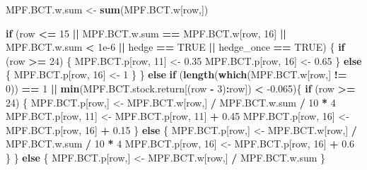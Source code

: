 \documentclass[
]{article}
\newenvironment{Shaded}{\begin{snugshade}}{\end{snugshade}}
\newcommand{\ControlFlowTok}[1]{\textcolor[rgb]{0.13,0.29,0.53}{\textbf{#1}}}
\newcommand{\DecValTok}[1]{\textcolor[rgb]{0.00,0.00,0.81}{#1}}
\newcommand{\FloatTok}[1]{\textcolor[rgb]{0.00,0.00,0.81}{#1}}
\newcommand{\KeywordTok}[1]{\textcolor[rgb]{0.13,0.29,0.53}{\textbf{#1}}}
\newcommand{\NormalTok}[1]{#1}
\newcommand{\OperatorTok}[1]{\textcolor[rgb]{0.81,0.36,0.00}{\textbf{#1}}}
\newcommand{\OtherTok}[1]{\textcolor[rgb]{0.56,0.35,0.01}{#1}}
\newcommand{\StringTok}[1]{\textcolor[rgb]{0.31,0.60,0.02}{#1}}
\begin{document}
\begin{Shaded}
\begin{Highlighting}[]
  
  
\NormalTok{  MPF.BCT.w.sum <-}\StringTok{ }\KeywordTok{sum}\NormalTok{(MPF.BCT.w[row,])}
  
  
  \ControlFlowTok{if}\NormalTok{ (row }\OperatorTok{<=}\StringTok{ }\DecValTok{15} \OperatorTok{||}\StringTok{ }\NormalTok{MPF.BCT.w.sum }\OperatorTok{==}\StringTok{ }\NormalTok{MPF.BCT.w[row, }\DecValTok{16}\NormalTok{] }\OperatorTok{||}
\StringTok{      }\NormalTok{MPF.BCT.w.sum }\OperatorTok{<}\StringTok{ }\FloatTok{1e-6} \OperatorTok{||}\StringTok{ }\NormalTok{hedge }\OperatorTok{==}\StringTok{ }\OtherTok{TRUE} \OperatorTok{||}\StringTok{ }\NormalTok{hedge_once }\OperatorTok{==}\StringTok{ }\OtherTok{TRUE}\NormalTok{) \{}
    \ControlFlowTok{if}\NormalTok{ (row }\OperatorTok{>=}\StringTok{ }\DecValTok{24}\NormalTok{) \{}
\NormalTok{      MPF.BCT.p[row, }\DecValTok{11}\NormalTok{] <-}\StringTok{ }\FloatTok{0.35}
\NormalTok{      MPF.BCT.p[row, }\DecValTok{16}\NormalTok{] <-}\StringTok{ }\FloatTok{0.65}
\NormalTok{    \} }\ControlFlowTok{else}\NormalTok{ \{}
\NormalTok{      MPF.BCT.p[row, }\DecValTok{16}\NormalTok{] <-}\StringTok{ }\DecValTok{1}
\NormalTok{    \}}
\NormalTok{  \} }\ControlFlowTok{else} \ControlFlowTok{if}\NormalTok{ (}\KeywordTok{length}\NormalTok{(}\KeywordTok{which}\NormalTok{(MPF.BCT.w[row,] }\OperatorTok{!=}\StringTok{ }\DecValTok{0}\NormalTok{)) }\OperatorTok{==}\StringTok{ }\DecValTok{1} \OperatorTok{||}
\StringTok{             }\KeywordTok{min}\NormalTok{(MPF.BCT.stock.return[(row }\OperatorTok{-}\StringTok{ }\DecValTok{3}\NormalTok{)}\OperatorTok{:}\NormalTok{row]) }\OperatorTok{<}\StringTok{ }\FloatTok{-0.065}\NormalTok{)\{}
    \ControlFlowTok{if}\NormalTok{ (row }\OperatorTok{>=}\StringTok{ }\DecValTok{24}\NormalTok{) \{}
\NormalTok{      MPF.BCT.p[row,] <-}\StringTok{ }\NormalTok{MPF.BCT.w[row,] }\OperatorTok{/}\StringTok{ }\NormalTok{MPF.BCT.w.sum }\OperatorTok{/}\StringTok{ }\DecValTok{10} \OperatorTok{*}\StringTok{ }\DecValTok{4}
\NormalTok{      MPF.BCT.p[row, }\DecValTok{11}\NormalTok{] <-}\StringTok{ }\NormalTok{MPF.BCT.p[row, }\DecValTok{11}\NormalTok{] }\OperatorTok{+}\StringTok{ }\FloatTok{0.45}
\NormalTok{      MPF.BCT.p[row, }\DecValTok{16}\NormalTok{] <-}\StringTok{ }\NormalTok{MPF.BCT.p[row, }\DecValTok{16}\NormalTok{] }\OperatorTok{+}\StringTok{ }\FloatTok{0.15}
\NormalTok{    \} }\ControlFlowTok{else}\NormalTok{ \{}
\NormalTok{      MPF.BCT.p[row,] <-}\StringTok{ }\NormalTok{MPF.BCT.w[row,] }\OperatorTok{/}\StringTok{ }\NormalTok{MPF.BCT.w.sum }\OperatorTok{/}\StringTok{ }\DecValTok{10} \OperatorTok{*}\StringTok{ }\DecValTok{4}
\NormalTok{      MPF.BCT.p[row, }\DecValTok{16}\NormalTok{] <-}\StringTok{ }\NormalTok{MPF.BCT.p[row, }\DecValTok{16}\NormalTok{] }\OperatorTok{+}\StringTok{ }\FloatTok{0.6}
\NormalTok{    \}}
\NormalTok{  \} }\ControlFlowTok{else}\NormalTok{ \{}
\NormalTok{    MPF.BCT.p[row,] <-}\StringTok{ }\NormalTok{MPF.BCT.w[row,] }\OperatorTok{/}\StringTok{ }\NormalTok{MPF.BCT.w.sum}
\NormalTok{  \}}
  

\end{Highlighting}
\end{Shaded}
\end{document}
